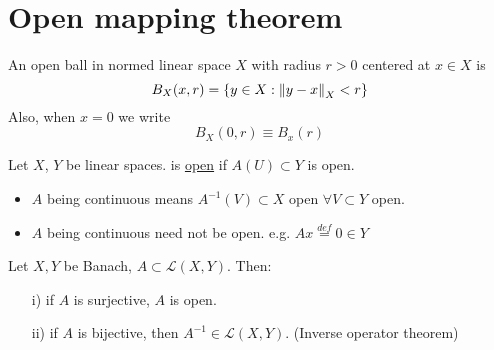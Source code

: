 \newpage
\section{Open mapping theorem}

\begin{comment}
\begin{definition}[Open map]\label{open map}\nl
	An open map is one for which the image of every open set is open.
\end{definition}
\begin{theorem}[Open Mapping Theorem]\label{OMT}\nl
	Let $X,Y$ be Banach spaces, $T:X\xrightarrow{}Y$ a continuous surjective linear map. Then $T$ is an open map.
\end{theorem}
\end{comment}

\begin{definition}\nl
	An open ball in normed linear space $X$ with radius $r>0$ centered at $x\in X$ is
	$$
		B_X(x,r)=\{y\in X:\left\|{y-x}\right\|_X<r\}
	$$
	Also, when $x=0$ we write
	$$
		B_X(0,r)\equiv B_x(r)
	$$
\end{definition}

\begin{definition}\label{open map}\nl
	Let $X$, $Y$ be linear spaces.  is {\underline{open}} if $A(U)\subset Y $ is open.
\end{definition}

\begin{remark}\hfill

	\begin{itemize}
		\item $A$ being continuous means $A^{-1}(V)\subset{X}$ open $\forall V\subset Y$ open.
		\item $A$ being continuous need not be open. e.g. $Ax\stackrel{def}{=}0\in Y$
	\end{itemize}
\end{remark}

\begin{theorem}\label{OMT}\nl
	Let $X,Y$ be Banach, $A\subset\mathcal{L}(X,Y)$. Then:
	\begin{itemize}
		\item[i)] if $A$ is surjective, $A$ is open.
		\item[ii)] if $A$ is bijective, then $A^{-1}\in \mathcal{L}(X,Y)$. (Inverse operator theorem)
	\end{itemize}
\end{theorem}

